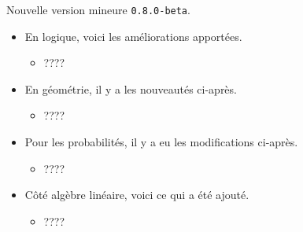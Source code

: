 Nouvelle version mineure \verb+0.8.0-beta+.

\begin{itemize}[itemsep=.5em]
    \item En logique, voici les améliorations apportées.
    \begin{itemize}[itemsep=.5em]
        \item ????
    \end{itemize}


    \item En géométrie, il y a les nouveautés ci-après.
    \begin{itemize}[itemsep=.5em]
        \item ????
    \end{itemize}


    \item Pour les probabilités, il y a eu les modifications ci-après.
    \begin{itemize}[itemsep=.5em]
        \item ????
    \end{itemize}


    \item Côté algèbre linéaire, voici ce qui a été ajouté.
    \begin{itemize}[itemsep=.5em]
        \item ????
    \end{itemize}
\end{itemize}

